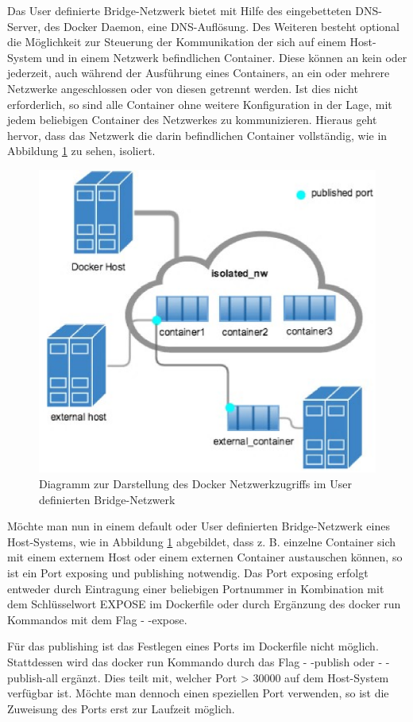 Das User definierte Bridge-Netzwerk bietet mit Hilfe des eingebetteten DNS-Server, des Docker Daemon, eine DNS-Auflösung.
Des Weiteren besteht optional die Möglichkeit zur Steuerung der Kommunikation der sich auf einem Host-System und in einem Netzwerk befindlichen Container.
Diese können an kein oder jederzeit, auch während der Ausführung eines Containers, an ein oder mehrere Netzwerke angeschlossen oder von diesen getrennt werden.
Ist dies nicht erforderlich, so sind alle Container ohne weitere Konfiguration in der Lage, mit jedem beliebigen Container des Netzwerkes zu kommunizieren.
Hieraus geht hervor, dass das Netzwerk die darin befindlichen Container vollständig, wie in Abbildung \ref{fig:dockerportpuex} zu sehen, isoliert.

\begin{figure}
	\centering
	\includegraphics[width=0.7\linewidth]{figures/DockerPortPuEx}
	\caption[Docker Netzwerkzugriff]{Diagramm zur Darstellung des Docker Netzwerkzugriffs im User definierten Bridge-Netzwerk}
	\label{fig:dockerportpuex}
\end{figure}

Möchte man nun in einem default oder User definierten Bridge-Netzwerk eines Host-Systems, wie in Abbildung \ref{fig:dockerportpuex} abgebildet, dass z. B. einzelne Container sich mit einem externem Host oder einem externen Container austauschen können, so ist ein Port exposing und publishing notwendig.
Das Port exposing erfolgt entweder durch Eintragung einer beliebigen Portnummer in Kombination mit dem Schlüsselwort EXPOSE im Dockerfile oder durch Ergänzung des docker run Kommandos mit dem Flag - -expose.

Für das publishing ist das Festlegen eines Ports im Dockerfile nicht möglich.
Stattdessen wird das docker run Kommando durch das Flag - -publish oder - -publish-all ergänzt.
Dies teilt mit, welcher Port > 30000 auf dem Host-System verfügbar ist.
Möchte man dennoch einen speziellen Port verwenden, so ist die Zuweisung des Ports erst zur Laufzeit möglich.


